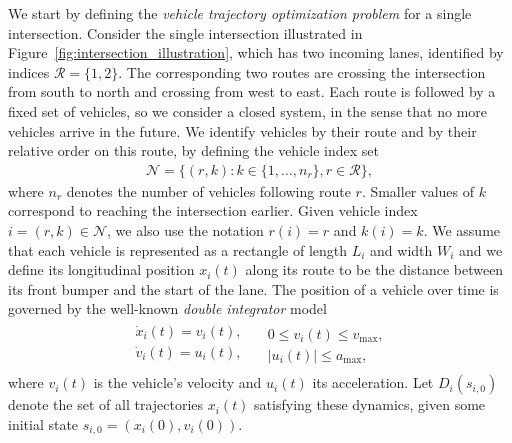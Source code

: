 \documentclass[a4paper]{article}
\theoremstyle{definition}
\theoremstyle{plain}
\begin{document}
We start by defining the \textit{vehicle trajectory optimization problem} for a
single intersection.
%
Consider the single intersection illustrated in
Figure~\ref{fig:intersection_illustration}, which has two incoming lanes,
identified by indices $\mathcal{R} = \{ 1, 2 \}$. The corresponding two routes
are crossing the intersection from south to north and crossing from west to
east.
%
Each route is followed by a fixed set of vehicles, so we consider a closed
system, in the sense that no more vehicles arrive in the future.
%
We identify vehicles by their route and by their relative order on this
route, by defining the vehicle index set
\begin{align}
  \mathcal{N} = \{ (r, k) : k \in \{1, \dots, n_{r}\}, r \in \mathcal{R}\} ,
\end{align}
where $n_{r}$ denotes the number of vehicles following route $r$. Smaller
values of $k$ correspond to reaching the intersection earlier. Given vehicle
index $i = (r, k) \in \mathcal{N}$, we also use the notation $r(i) = r$ and
$k(i) = k$.
%
We assume that each vehicle is represented as a rectangle of length $L_{i}$ and
width $W_{i}$ and we define its longitudinal position $x_{i}(t)$ along its route
to be the distance between its front bumper and the start of the lane. The
position of a vehicle over time is governed by the well-known \textit{double integrator}
model
\begin{gather}
  \label{eq:vehicle_dynamics}
\begin{aligned}
  \dot{x}_{i}(t) = v_{i}(t) , \\
  \dot{v}_{i}(t) = u_{i}(t)  , \\
\end{aligned}
\quad
\begin{aligned}
  0 \leq v_{i}(t) \leq v_{\max} , \\
  |u_{i}(t) | \leq a_{\max} ,
\end{aligned}
\end{gather}
where $v_{i}(t)$ is the vehicle's velocity and $u_{i}(t)$ its acceleration. Let
$D_{i}(s_{i,0})$ denote the set of all trajectories $x_{i}(t)$ satisfying these
dynamics, given some initial state $s_{i,0} = (x_{i}(0), v_{i}(0))$.
\end{document}
